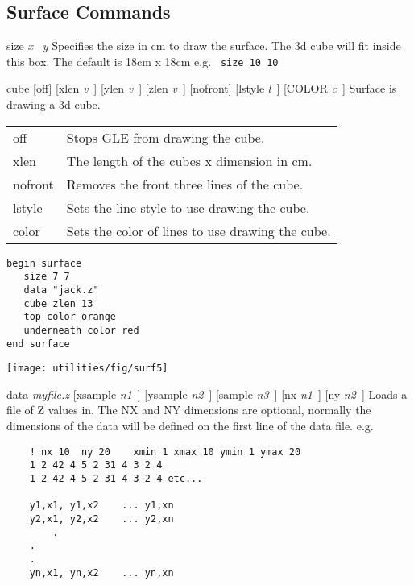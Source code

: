 \subsection{Surface Commands}
\begin{commanddescription}
\item[{\sf size {\it x} \  {\it y}}]
Specifies the size in cm to draw the surface.  The 3d cube
will fit inside this box.  The default is 18cm x 18cm 
e.g. \verb# size 10 10#

\item[{\sf cube [off]  [xlen {\it v}\ ] [ylen {\it v}\ ] [zlen {\it v}\ ] [nofront]  [lstyle {\it l}\ ]  [COLOR {\it c}\ ]  }]
Surface is drawing a 3d cube.

\begin{tabular}{ll}
off     & Stops GLE from drawing the cube.\\
xlen    & The length of the cubes x dimension in cm.\\
nofront & Removes the front three lines of the cube.\\
lstyle  & Sets the line style to use drawing the cube.\\
color   & Sets the color of lines to use drawing the cube.\\
\end{tabular}

\begin{minipage}[c]{8cm}
\begin{Verbatim}
begin surface
   size 7 7
   data "jack.z"
   cube zlen 13
   top color orange
   underneath color red
end surface
\end{Verbatim}
\end{minipage}
\hfill
\begin{minipage}[c]{7cm}
\mbox{\texttt{[image: utilities/fig/surf5]}}
\end{minipage}

\item[{\sf data {\it myfile.z}  [xsample {\it n1}\ ] [ysample {\it n2}\ ] [sample {\it n3}\ ]  [nx {\it n1}\ ] [ny {\it n2}\ ]}]
\label{zfile:pg}
Loads a file of Z values in.  The NX and NY dimensions
are optional, normally the dimensions of the data will
be defined on the first line of the data file. e.g.
\begin{verbatim}
	! nx 10  ny 20    xmin 1 xmax 10 ymin 1 ymax 20
	1 2 42 4 5 2 31 4 3 2 4
	1 2 42 4 5 2 31 4 3 2 4 etc...
	
	y1,x1, y1,x2	...	y1,xn
	y2,x1, y2,x2	...	y2,xn
        .
	.
	.
	yn,x1, yn,x2	...	yn,xn
\end{verbatim}


\end{commanddescription}
